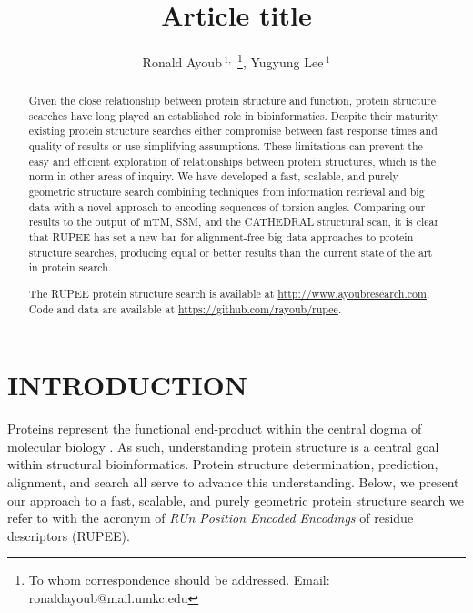 \documentclass[letter,center,fleqn]{NAR}
\begin{document}
\title{Article title}

\author{%
Ronald Ayoub\,$^{1,}$%
\footnote{To whom correspondence should be addressed.
Email: ronaldayoub@mail.umkc.edu},
Yugyung Lee\,$^{1}$}

\address{%
$^{1}$
School of Computing and Engineering, 
University of Missouri at Kansas City,
5110 Rockhill Road,
Kansas City, MO 64110, USA}



\maketitle

\begin{abstract}
Given the close relationship between protein structure and function, protein structure searches have long played an established role in bioinformatics. 
Despite their maturity, existing protein structure searches either compromise between fast response times and quality of results or use simplifying assumptions. 
These limitations can prevent the easy and efficient exploration of relationships between protein structures, which is the norm in other areas of inquiry.
We have developed a fast, scalable, and purely geometric structure search combining techniques from information retrieval and big data with a novel approach to encoding sequences of torsion angles. 
Comparing our results to the output of mTM, SSM, and the CATHEDRAL structural scan, it is clear that RUPEE has set a new bar for alignment-free big data approaches to protein structure searches, producing equal or better results than the current state of the art in protein search.

The RUPEE protein structure search is available at \url{http://www.ayoubresearch.com}. Code and data are available at \url{https://github.com/rayoub/rupee}.
\end{abstract}

\section{INTRODUCTION}

Proteins represent the functional end-product within the central dogma of molecular biology \cite{Crick1970}.
As such, understanding protein structure is a central goal within structural bioinformatics. 
Protein structure determination, prediction, alignment, and search all serve to advance this understanding. 
Below, we present our approach to a fast, scalable, and purely geometric protein structure search we refer to with the acronym of \emph{RUn Position Encoded Encodings} of residue descriptors (RUPEE).
\end{document}
